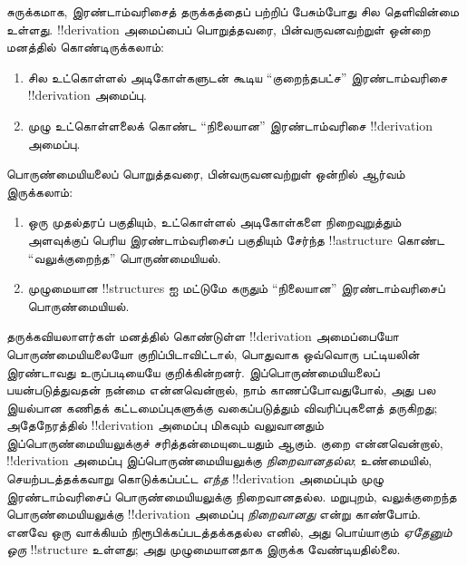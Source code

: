 \documentclass[../../../include/open-logic-section]{subfiles}
\begin{document}
சுருக்கமாக, இரண்டாம்வரிசைத் தருக்கத்தைப் பற்றிப் பேசும்போது சில
தெளிவின்மை உள்ளது. !!{derivation} அமைப்பைப் பொறுத்தவரை, பின்வருவனவற்றுள்
ஒன்றை மனத்தில் கொண்டிருக்கலாம்:
\begin{enumerate}
\item சில உட்கொள்ளல் அடிகோள்களுடன் கூடிய ``குறைந்தபட்ச''
  இரண்டாம்வரிசை !!{derivation} அமைப்பு.
\item முழு உட்கொள்ளலைக் கொண்ட ``நிலையான'' இரண்டாம்வரிசை
  !!{derivation} அமைப்பு.
\end{enumerate}
பொருண்மையியலைப் பொறுத்தவரை, பின்வருவனவற்றுள் ஒன்றில் ஆர்வம் இருக்கலாம்:
\begin{enumerate}
\item ஒரு முதல்தரப் பகுதியும், உட்கொள்ளல் அடிகோள்களை நிறைவுறுத்தும்
  அளவுக்குப் பெரிய இரண்டாம்வரிசைப் பகுதியும் சேர்ந்த !!a{structure}
  கொண்ட ``வலுக்குறைந்த'' பொருண்மையியல்.
\item முழுமையான !!{structure}s ஐ மட்டுமே கருதும் ``நிலையான''
  இரண்டாம்வரிசைப் பொருண்மையியல்.
\end{enumerate}
தருக்கவியலாளர்கள் மனத்தில் கொண்டுள்ள !!{derivation} அமைப்பையோ
பொருண்மையியலையோ குறிப்பிடாவிட்டால், பொதுவாக ஒவ்வொரு பட்டியலின்
இரண்டாவது உருப்படியையே குறிக்கின்றனர். இப்பொருண்மையியலைப் பயன்படுத்துவதன்
நன்மை என்னவென்றால், நாம் காணப்போவதுபோல், அது பல இயல்பான கணிதக்
கட்டமைப்புகளுக்கு வகைப்படுத்தும் விவரிப்புகளைத் தருகிறது; அதேநேரத்தில்
!!{derivation} அமைப்பு மிகவும் வலுவானதும் இப்பொருண்மையியலுக்குச்
சரித்தன்மையுடையதும் ஆகும். குறை என்னவென்றால், !!{derivation} அமைப்பு
இப்பொருண்மையியலுக்கு \emph{நிறைவானதல்ல}; உண்மையில், செயற்படத்தக்கவாறு
கொடுக்கப்பட்ட \emph{எந்த} !!{derivation} அமைப்பும் முழு
இரண்டாம்வரிசைப் பொருண்மையியலுக்கு நிறைவானதல்ல. மறுபுறம்,
வலுக்குறைந்த பொருண்மையியலுக்கு !!{derivation} அமைப்பு
\emph{நிறைவானது} என்று காண்போம். எனவே ஒரு வாக்கியம்
நிரூபிக்கப்படத்தக்கதல்ல எனில், அது பொய்யாகும் \emph{ஏதேனும் ஒரு}
!!{structure} உள்ளது; அது முழுமையானதாக இருக்க வேண்டியதில்லை.
\end{document}
